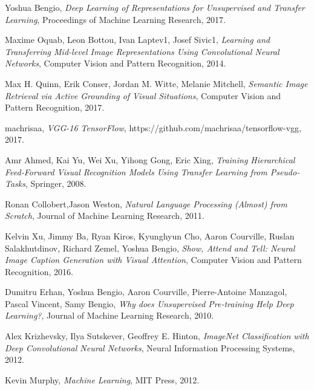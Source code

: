\documentclass [11pt,letterpaper ,twoside ,openany ]{report}
\begin{document}
\begin{thebibliography}{9}
          Yoshua Bengio,
          \textit{Deep Learning of Representations for Unsupervised and Transfer Learning},
          Proceedings of Machine Learning Research,
          2017.                               

          Maxime Oquab, Leon Bottou, Ivan Laptev1, Josef Sivic1,
          \textit{Learning and Transferring Mid-level Image Representations Using Convolutional Neural Networks},
          Computer Vision and Pattern Recognition,
          2014.

          Max H. Quinn, Erik Conser, Jordan M. Witte, Melanie Mitchell,
          \textit{Semantic Image Retrieval via Active Grounding of Visual Situations},
          Computer Vision and Pattern Recognition,
          2017.          

          machrisaa,
          \textit{VGG-16 TensorFlow},
          https://github.com/machrisaa/tensorflow-vgg,
          2017.                    

          Amr Ahmed, Kai Yu, Wei Xu, Yihong Gong, Eric Xing,
          \textit{Training Hierarchical Feed-Forward Visual Recognition Models Using Transfer Learning from Pseudo-Tasks},
          Springer,
          2008.                                        
          
          Ronan Collobert,Jason Weston,
          \textit{Natural Language Processing (Almost) from Scratch},
          Journal of Machine Learning Research,
          2011.                             

          Kelvin Xu, Jimmy Ba, Ryan Kiros, Kyunghyun Cho, Aaron Courville, Ruslan Salakhutdinov, Richard Zemel, Yoshua Bengio,
          \textit{Show, Attend and Tell: Neural Image Caption Generation with Visual Attention},
          Computer Vision and Pattern Recognition,
          2016.                                

          Dumitru Erhan, Yoshua Bengio, Aaron Courville, Pierre-Antoine Manzagol, Pascal Vincent, Samy Bengio,
          \textit{Why does Unsupervised Pre-training Help Deep Learning?},
          Journal of Machine Learning Research,
          2010.                                       

          Alex Krizhevsky, Ilya Sutskever, Geoffrey E. Hinton,
          \textit{ImageNet Classification with Deep Convolutional Neural Networks},
          Neural Information Processing Systems,
          2012.        

          Kevin Murphy,
          \textit{Machine Learning},
          MIT Press,
          2012.            

    \end{thebibliography}
\end{document}
